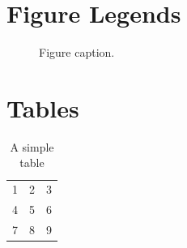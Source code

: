 \documentclass[11pt]{article}
\begin{document}


%
%


\section*{Figure Legends}

\begin{figure}
\caption{Figure caption.}
\label{Figure_label}
\end{figure}


\section*{Tables}


\begin{table}[h!]
  \begin{center}
    \begin{tabular}{| l c r |}
    \hline
    1 & 2 & 3 \\
    4 & 5 & 6 \\
    7 & 8 & 9 \\
    \hline
    \end{tabular}
  \end{center}
  \caption{A simple table}
\end{table}
\end{document}
